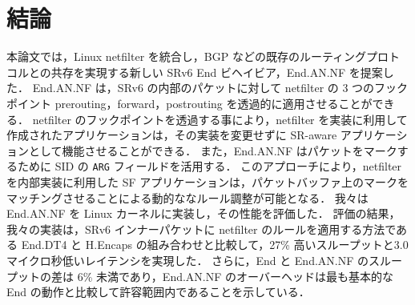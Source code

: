 \chapter{結論}
\label{chap:conclusion}
本論文では，Linux netfilter を統合し，BGP などの既存のルーティングプロトコルとの共存を実現する新しい SRv6 End ビヘイビア，End.AN.NF を提案した．
End.AN.NF は，SRv6 の内部のパケットに対して netfilter の 3 つのフックポイント prerouting，forward，postrouting を透過的に適用させることができる．
netfilter のフックポイントを透過する事により，netfilter を実装に利用して作成されたアプリケーションは，その実装を変更せずに SR-aware アプリケーションとして機能させることができる．
また，End.AN.NF はパケットをマークするために SID の \texttt{ARG} フィールドを活用する．
このアプローチにより，netfilter を内部実装に利用した SF アプリケーションは，パケットバッファ上のマークをマッチングさせることによる動的ななルール調整が可能となる．
我々は End.AN.NF を Linux カーネルに実装し，その性能を評価した．
評価の結果，我々の実装は，SRv6 インナーパケットに netfilter のルールを適用する方法である End.DT4 と H.Encaps の組み合わせと比較して，27\% 高いスループットと3.0マイクロ秒低いレイテンシを実現した．
さらに，End と End.AN.NF のスループットの差は 6\% 未満であり，End.AN.NF のオーバーヘッドは最も基本的な End の動作と比較して許容範囲内であることを示している．

